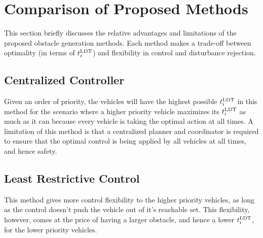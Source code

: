 %

\section{Comparison of Proposed Methods}
This section briefly discusses the relative advantages and limitations of the proposed obstacle generation methods. Each method makes a trade-off between optimality (in terms of $t^\text{LDT}_i$) and flexibility in control and disturbance rejection.

\subsection{Centralized Controller}
Given an order of priority, the vehicles will have the highest possible $t^\text{LDT}_i$ in this method for the scenario where a higher priority vehicle maximizes its $t^\text{LDT}_i$ as much as it can because every vehicle is taking the optimal action at all times. 
A limitation of this method is that a centralized planner and coordinator is required to ensure that the optimal control is being applied by all vehicles at all times, and hence safety.

\subsection{Least Restrictive Control}
This method gives more control flexibility to the higher priority vehicles, as long as the control doesn't push the vehicle out of it's reachable set. This flexibility, however, comes at the price of having a larger obstacle, and hence a lower $t^\text{LDT}_i$, for the lower priority vehicles.  

